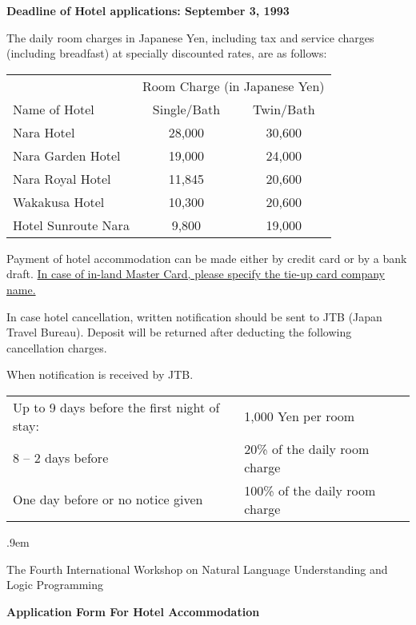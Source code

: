 {\bf Deadline of Hotel applications: September 3, 1993}

The daily room charges in Japanese Yen, including tax and service
charges (including breadfast) at specially discounted rates, are as
follows:

\begin{center}
\begin{tabular}{|l|c|c|}\hline
  & \multicolumn{2}{|c|}{Room Charge (in Japanese Yen)}\\ \cline{2-3}
Name of Hotel	  & Single/Bath & Twin/Bath\\ \hline\hline
Nara Hotel	  & 28,000	& 30,600\\ \hline
Nara Garden Hotel & 19,000	& 24,000\\ \hline
Nara Royal Hotel  & 11,845	& 20,600\\ \hline
Wakakusa Hotel	  & 10,300	& 20,600\\ \hline
Hotel Sunroute Nara & 9,800	& 19,000\\ \hline
\end{tabular}
\end{center}

Payment of hotel accommodation can be made either by credit card or by
a bank draft.  \underline{In case of in-land Master Card, please
specify the tie-up card company name.}

In case hotel cancellation, written notification should be sent to JTB
(Japan Travel Bureau).  Deposit will be returned after deducting the
following cancellation charges.

When notification is received by JTB.

\begin{tabular}{ll}
Up to 9 days before the first night of stay: & 1,000 Yen per room\\
8 -- 2 days before & 20\% of the daily room charge\\
One day before or no notice given & 100\% of the daily room charge
\end{tabular}

\clearpage


\parskip .9em
\begin{center}
{\large The Fourth International Workshop on Natural Language Understanding
and Logic Programming}

{\Large\bf Application Form For Hotel Accommodation}
\end{center}

